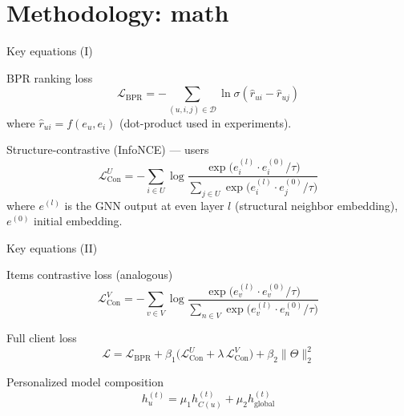 \documentclass{beamer}
\begin{document}
\section{Methodology: math}
\begin{frame}{Key equations (I)}
  \begin{block}{BPR ranking loss}
    \[
      \mathcal{L}_{\text{BPR}} = - \sum_{(u,i,j)\in \mathcal{D}} \ln \sigma(\hat r_{ui} - \hat r_{uj})
    \]
    where $\hat r_{ui}=f(e_u,e_i)$ (dot-product used in experiments).
  \end{block}
  \begin{block}{Structure-contrastive (InfoNCE) — users}
    \[
    \mathcal{L}_{\text{Con}}^{U} = -\sum_{i\in U}\log \frac{\exp\big(e_i^{(l)}\cdot e_i^{(0)}/\tau\big)}
    {\sum_{j\in U}\exp\big(e_i^{(l)}\cdot e_j^{(0)}/\tau\big)}
    \]
    where $e^{(l)}$ is the GNN output at even layer $l$ (structural neighbor embedding), $e^{(0)}$ initial embedding.
  \end{block}
\end{frame}

\begin{frame}{Key equations (II)}
  \begin{block}{Items contrastive loss (analogous)}
    \[
    \mathcal{L}_{\text{Con}}^{V} = -\sum_{v\in V}\log \frac{\exp\big(e_v^{(l)}\cdot e_v^{(0)}/\tau\big)}
    {\sum_{n\in V}\exp\big(e_v^{(l)}\cdot e_n^{(0)}/\tau\big)}
    \]
  \end{block}
  \begin{block}{Full client loss}
    \[
      \mathcal{L} = \mathcal{L}_{\text{BPR}} + \beta_1\big(\mathcal{L}_{\text{Con}}^{U} + \lambda \,\mathcal{L}_{\text{Con}}^{V}\big) + \beta_2\|\Theta\|_2^2
    \]
  \end{block}
  \begin{block}{Personalized model composition}
    \[
      h_u^{(t)} = \mu_1 h_{C(u)}^{(t)} + \mu_2 h_{\text{global}}^{(t)}
    \]
  \end{block}
\end{frame}

\end{document}
